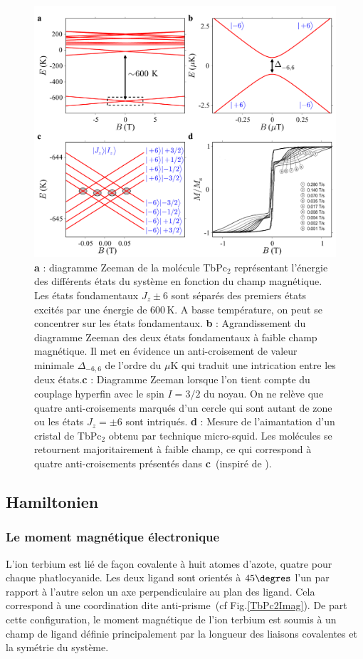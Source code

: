 \begin{figure}
\centering \includegraphics[scale=0.45]{Resultats/TbPc2Mag/TbPc2Mag.pdf} 
\caption{\textbf{a} : diagramme Zeeman de la molécule TbPc$_2$ représentant l'énergie des différents états du système en fonction du champ magnétique. Les états fondamentaux $J_z \pm 6$ sont séparés des premiers états excités par une énergie de $600$\,K. A basse température, on peut se concentrer sur les états fondamentaux. \textbf{b} : Agrandissement du diagramme Zeeman des deux états fondamentaux à faible champ magnétique. Il met en évidence un anti-croisement de valeur minimale $\Delta_{-6,6}$ de l'ordre du $\mu$K qui traduit une intrication entre les deux états.\textbf{c} : Diagramme Zeeman lorsque l'on tient compte du couplage hyperfin avec le spin $I=3/2$ du noyau. On ne relève que quatre anti-croisements marqués d'un cercle qui sont autant de zone ou les états $J_z =\pm6$ sont intriqués. \textbf{d} : Mesure de l'aimantation d'un cristal de TbPc$_2$ obtenu par technique micro-squid. Les molécules se retournent majoritairement à faible champ, ce qui correspond à quatre anti-croisements présentés dans \textbf{c}~(inspiré de \cite{Ishikawa2005}).}
\label{TbPc2Zeeman}
\end{figure}


\subsection{Hamiltonien}

\subsubsection{Le moment magnétique électronique}
L'ion terbium est lié de façon covalente à huit atomes d'azote, quatre pour chaque phatlocyanide. Les deux ligand sont orientés à $45\degres$ l'un par rapport à l'autre selon un axe perpendiculaire au plan des ligand. Cela correspond à une coordination dite anti-prisme~(cf Fig.\ref{TbPc2Imag}). De part cette configuration, le moment magnétique de l'ion terbium est soumis à un champ de ligand définie principalement par la longueur des liaisons covalentes et la symétrie du système. 

